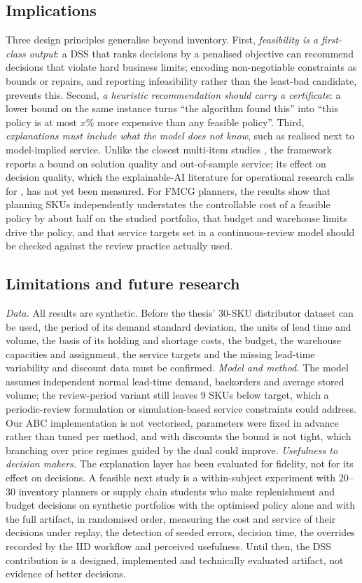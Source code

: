 \subsection{Implications}
Three design principles generalise beyond inventory. First, \emph{feasibility is a first-class output}: a DSS that ranks decisions by a penalised objective can recommend decisions that violate hard business limits; encoding non-negotiable constraints as bounds or repairs, and reporting infeasibility rather than the least-bad candidate, prevents this. Second, \emph{a heuristic recommendation should carry a certificate}: a lower bound on the same instance turns ``the algorithm found this'' into ``this policy is at most $x$\% more expensive than any feasible policy''. Third, \emph{explanations must include what the model does not know}, such as realised next to model-implied service. Unlike the closest multi-item studies \citep{Pasandideh2013,Tan2024}, the framework reports a bound on solution quality and out-of-sample service; its effect on decision quality, which the explainable-AI literature for operational research calls for \citep{DeBock2024,Coussement2024}, has not yet been measured. For FMCG planners, the results show that planning SKUs independently understates the controllable cost of a feasible policy by about half on the studied portfolio, that budget and warehouse limits drive the policy, and that service targets set in a continuous-review model should be checked against the review practice actually used.

\subsection{Limitations and future research}\label{sec:limits}
\emph{Data.} All results are synthetic. Before the thesis' 30-SKU distributor dataset can be used, the period of its demand standard deviation, the units of lead time and volume, the basis of its holding and shortage costs, the budget, the warehouse capacities and assignment, the service targets and the missing lead-time variability and discount data must be confirmed.
\emph{Model and method.} The model assumes independent normal lead-time demand, backorders and average stored volume; the review-period variant still leaves 9 SKUs below target, which a periodic-review formulation or simulation-based service constraints could address. Our ABC implementation is not vectorised, parameters were fixed in advance rather than tuned per method, and with discounts the bound is not tight, which branching over price regimes guided by the dual could improve.
\emph{Usefulness to decision makers.} The explanation layer has been evaluated for fidelity, not for its effect on decisions. A feasible next study is a within-subject experiment with 20--30 inventory planners or supply chain students who make replenishment and budget decisions on synthetic portfolios with the optimised policy alone and with the full artifact, in randomised order, measuring the cost and service of their decisions under replay, the detection of seeded errors, decision time, the overrides recorded by the IID workflow and perceived usefulness. Until then, the DSS contribution is a designed, implemented and technically evaluated artifact, not evidence of better decisions.
